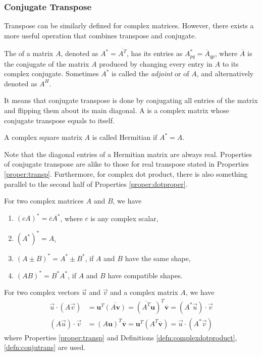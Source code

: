\subsubsection{Conjugate Transpose}
Transpose can be similarly defined for complex matrices. However, there exists a more useful operation that combines transpose and conjugate.
\begin{defn}
\label{defn:conjutrans}
The  of a matrix $A$, denoted as $A^* = \overline{A^T}$, has its entries as $A^*_{pq} = \overline{A}_{qp}$, where $\overline{A}$ is the conjugate of the matrix $A$ produced by changing every entry in $A$ to its complex conjugate. Sometimes $A^*$ is called the \textit{adjoint} or  of $A$, and alternatively denoted as $A^H$. 
\end{defn}
It means that conjugate transpose is done by conjugating all entries of the matrix and flipping them about its main diagonal. A  is a complex matrix whose conjugate transpose equals to itself.
\begin{defn}
\label{defn:Hermitian}
A complex square matrix $A$ is called Hermitian if $A^* = A$.
\end{defn}
Note that the diagonal entries of a Hermitian matrix are always real. Properties of conjugate transpose are alike to those for real transpose stated in Properties \ref{proper:transp}. Furthermore, for complex dot product, there is also something parallel to the second half of Properties \ref{proper:dotproper}.
\begin{proper}
\label{proper:complexmat}
For two complex matrices $A$ and $B$, we have
\begin{enumerate}
\item $(cA)^* = \overline{c}A^*$, where $c$ is any complex scalar,
\item $(A^*)^* = A$,
\item $(A \pm B)^* = A^* \pm B^*$, if $A$ and $B$ have the same shape,
\item $(AB)^* = B^*A^*$, if $A$ and $B$ have compatible shapes.
\end{enumerate}
\end{proper}
\begin{proper}
\label{proper:complexdotherm}
For two complex vectors $\vec{u}$ and $\vec{v}$ and a complex matrix $A$, we have 
\begin{align*}
\vec{u} \cdot (A\vec{v}) &= \textbf{u}^T\overline{(A\textbf{v})} = (\overline{A^T}\textbf{u})^T\overline{\textbf{v}} = (A^*\vec{u}) \cdot \vec{v} \\
(A\vec{u}) \cdot \vec{v} &= (A\textbf{u})^T\overline{\textbf{v}} = \textbf{u}^T(A^T\overline{\textbf{v}}) = \vec{u} \cdot (A^*\vec{v})
\end{align*}
where Properties \ref{proper:transp} and Definitions \ref{defn:complexdotproduct}, \ref{defn:conjutrans} are used.
\end{proper}


